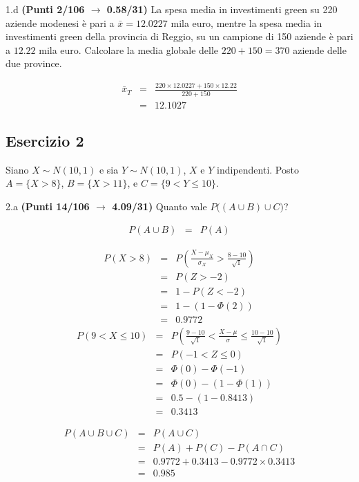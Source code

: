 \documentclass[
  11pt,
]{book}
\theoremstyle{mytheoremstyle}
\theoremstyle{mydefstyle}
\newenvironment{sol}
  {
  \begin{tcolorbox}[enhanced,breakable,arc=0.1mm,boxrule=1pt,colback=white,colframe=iblue,
  title=\bf \fontfamily{lmss}\selectfont \hspace{.5 cm} Soluzione,drop fuzzy shadow]

}{
\end{tcolorbox}
  }
\begin{document}
1.d \textbf{(Punti 2/106 \(\rightarrow\) 0.58/31)} La spesa media in investimenti green su 220 aziende modenesi è pari a \(\bar x=12.0227\) mila euro, mentre la spesa media in investimenti green della provincia di Reggio, su un campione di 150 aziende è pari a \(12.22\) mila euro.
Calcolare la media globale delle \(220 + 150 = 370\) aziende delle due province.

\begin{eqnarray*}
\bar x_T&=&\frac{220\times12.0227+150\times12.22}{220+150}\\
&=& 12.1027
\end{eqnarray*}

\subsection{Esercizio 2}\label{esercizio-2-13}

Siano \(X\sim N(10,1)\) e sia \(Y\sim N(10,1)\), \(X\) e \(Y\) indipendenti. Posto \(A=\{X>8\}\), \(B=\{X>11\}\), e \(C=\{9<Y\le 10\}\).

2.a \textbf{(Punti 14/106 \(\rightarrow\) 4.09/31)} Quanto vale \(P\Big((A\cup B)\cup C\Big)\)?

\begin{sol}
\begin{eqnarray*}
P(A\cup B)&=&P(A)
\end{eqnarray*}

\begin{eqnarray*}
      P( X   >   8 ) 
        &=& P\left(  \frac { X  -  \mu_X }{ \sigma_X }  >  \frac { 8  -  10 }{\sqrt{ 1 }} \right)  \\
                 &=& P\left(  Z   >   -2 \right) \\    &=& 1-P(Z< -2 )\\ 
                 &=&  1-(1-\Phi( 2 )) \\ &=&  0.9772 
      \end{eqnarray*}\begin{eqnarray*}
   P( 9 < X \leq  10 ) &=& P\left( \frac { 9  -  10 }{\sqrt{ 1 }} < \frac { X  -  \mu }{ \sigma } \leq \frac { 10  -  10 }{\sqrt{ 1 }}\right)  \\
              &=& P\left(  -1  < Z \leq  0 \right) \\
              &=& \Phi( 0 )-\Phi( -1 )\\
              &=&  \Phi( 0 )-(1-\Phi( 1 )) \\ &=&  0.5 -(1- 0.8413 ) \\ 
              &=&  0.3413 
   \end{eqnarray*}

\begin{eqnarray*}
P(A\cup B\cup C)&=&P(A\cup C)\\
&=&P(A)+P(C)-P(A\cap C)\\
&=& 0.9772 +0.3413-0.9772\times 0.3413\\
&=& 0.985
\end{eqnarray*}

\end{sol}
\end{document}
